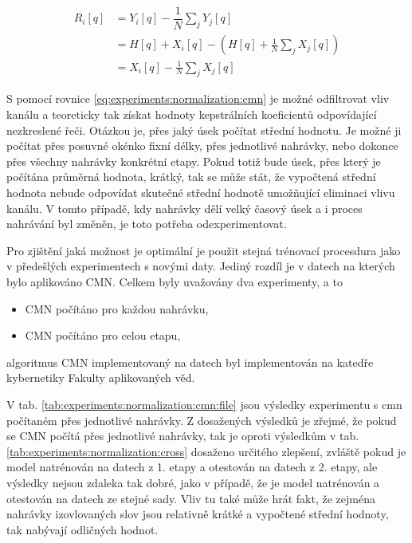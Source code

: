 \begin{align}
  R_i\left[q\right] &= Y_i\left[q\right] - \dfrac{1}{N}\sum_{j} Y_j\left[q\right] \nonumber  \\
  &= H\left[q\right] + X_i\left[q\right] - \left( H\left[q\right] + \frac{1}{N} \sum_j X_j\left[q\right] \right) \nonumber  \\
  &= X_i\left[q\right] - \frac{1}{N} \sum_j X_j\left[q\right]
  \label{eq:experiments:normalization:cmn}
\end{align}

\noindent S pomocí rovnice \ref{eq:experiments:normalization:cmn} je možné odfiltrovat vliv kanálu a teoreticky tak získat hodnoty kepstrálních koeficientů odpovídající nezkreslené řeči. Otázkou je, přes jaký úsek počítat střední hodnotu. Je možné ji počítat přes posuvné okénko fixní délky, přes jednotlivé nahrávky, nebo dokonce přes všechny nahrávky konkrétní etapy. Pokud totiž bude úsek, přes který je počítána průměrná hodnota, krátký, tak se může stát, že vypočtená střední hodnota nebude odpovídat skutečné střední hodnotě umožňující eliminaci vlivu kanálu. V tomto případě, kdy nahrávky dělí velký časový úsek a i proces nahrávání byl změněn, je toto potřeba odexperimentovat.

Pro zjištění jaká možnost je optimální je použit stejná trénovací procesdura jako v předešlých experimentech s novými daty. Jediný rozdíl je v datech na kterých bylo aplikováno CMN. Celkem byly uvažovány dva experimenty, a to

\begin{itemize}
  \item CMN počítáno pro každou nahrávku,
  \item CMN počítáno pro celou etapu,
\end{itemize}

\noindent algoritmus CMN implementovaný na datech byl implementován na katedře kybernetiky Fakulty aplikovaných věd.

V tab. \ref{tab:experiments:normalization:cmn:file} jsou výsledky experimentu s cmn počítaném přes jednotlivé nahrávky. Z dosažených výsledků je zřejmé, že pokud se CMN počítá přes jednotlivé nahrávky, tak je oproti výsledkům v tab. \ref{tab:experiments:normalization:cross} dosaženo určitého zlepšení, zvláště pokud je model natrénován na datech z 1. etapy a otestován na datech z 2. etapy, ale výsledky nejsou zdaleka tak dobré, jako v případě, že je model natrénován a otestován na datech ze stejné sady. Vliv tu také může hrát fakt, že zejména nahrávky izovlovaných slov jsou relativně krátké a vypočtené střední hodnoty, tak nabývají odličných hodnot.

